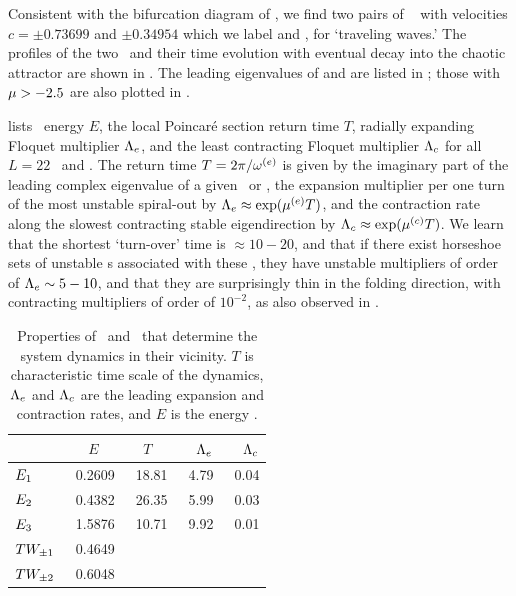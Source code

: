 Consistent with the bifurcation diagram of ,
we find two pairs of \reqva\  with velocities
$c =\pm 0.73699$ and $\pm 0.34954$
which we label  and ,
for `traveling waves.'
The profiles of the two \reqva\ and their time evolution
with eventual decay into the chaotic attractor are
shown in .  The leading eigenvalues of
 and  are listed in ;
those with $\eigRe > -2.5$ are also plotted in
.

 lists \eqv\ energy $E$,
the local Poincar\'e section return time $T$,
radially expanding Floquet multiplier $\Lambda_e$, and
the least contracting Floquet multiplier $\Lambda_c$
for all $L=22$ \eqva\ and \reqva.
The return time $T=2\pi/\eigIm[e]$ is given by the imaginary
part of the leading complex eigenvalue of a given
\eqv\ or \reqv,
the expansion
multiplier per one turn of the most unstable spiral-out by
$\ExpaEig_e\approx\exp(\eigRe[e] T)$, and the contraction
rate along the slowest contracting stable eigendirection by
$\ExpaEig_c\approx\exp(\eigRe[c]T)$. We learn that the shortest
`turn-over' time is $\approx 10-20$, and that if there exist
horseshoe sets of unstable \po s associated with
these \eqva,  they have unstable
multipliers of order of $\Lambda_e \sim 5-10$, and that
they are surprisingly thin in the folding direction, with
contracting multipliers of order of $10^{-2}$,
as also observed in .

\begin{table}[h!t]
    \caption[Characteristic
    time scales, expansion rates, contraction rates and energies of \eqva]{
    Properties of \eqva\ and \reqva\ that determine
    the system dynamics in their vicinity.  $T$ is characteristic
    time scale of the dynamics, $\Lambda_e$ and $\Lambda_c$ are the
    leading expansion and contraction rates, and $E$ is the
    energy .
            }
\begin{center} \footnotesize
    \begin{tabular}{l|rrrr}
                 & $E$~~   & $T$~~  & $\Lambda_e$  & $\Lambda_c$  \\ \hline
 $\EQV{1}\ $     &\ 0.2609 &\ 18.81 &\ 4.79     &\ 0.04 \\
 $\EQV{2}\ $     &\ 0.4382 &\ 26.35 &\ 5.99     &\ 0.03 \\
 $\EQV{3}\ $     &\ 1.5876 &\ 10.71 &\ 9.92     &\ 0.01 \\
 $TW_{\pm1}$ &\ 0.4649 &  &  & \\
 $TW_{\pm2}$ &\ 0.6048 &  &  & \\
    \end{tabular}
\end{center}
\label{tab:L22cminus}
\end{table}

